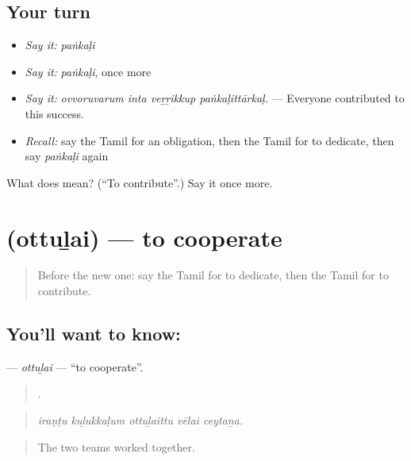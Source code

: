 \subsection*{Your turn}
\begin{itemize}
\raggedright
  \item \emph{Say it:} \emph{paṅkaḷi}
  \item \emph{Say it:} \emph{paṅkaḷi}, once more
  \item \emph{Say it:} \emph{ovvoruvarum inta veṟṟikkup paṅkaḷittārkaḷ.} — Everyone contributed to this success.
  \item \emph{Recall:} say the Tamil for an obligation, then the Tamil for to dedicate, then say \emph{paṅkaḷi} again
\end{itemize}

\begin{tcolorbox}[breakable,colback=teal!4,colframe=teal!35!black,title={Before you move on}]
What does  mean? (\textquotedblleft{}To contribute\textquotedblright{}.) Say it once more.
\end{tcolorbox}
\section[\texorpdfstring{\ta{ஒத்துழை} (ottuḻai)}{ஒத்துழை (ottuḻai)}]{ (ottuḻai) — to cooperate}

\label{lesson:TA-C380-ottulai}



\begin{quote}
Before the new one: say the Tamil for to dedicate, then the Tamil for to contribute.
\end{quote}

\subsection*{You'll want to know: }
\textbf{} — \emph{ottuḻai} — \textquotedblleft{}to cooperate\textquotedblright{}.

\begin{quote}
    .
\end{quote}

\begin{quote}
\emph{iraṇṭu kuḻukkaḷum ottuḻaittu vēlai ceytaṉa.}
\end{quote}

\begin{quote}
The two teams worked together.
\end{quote}


